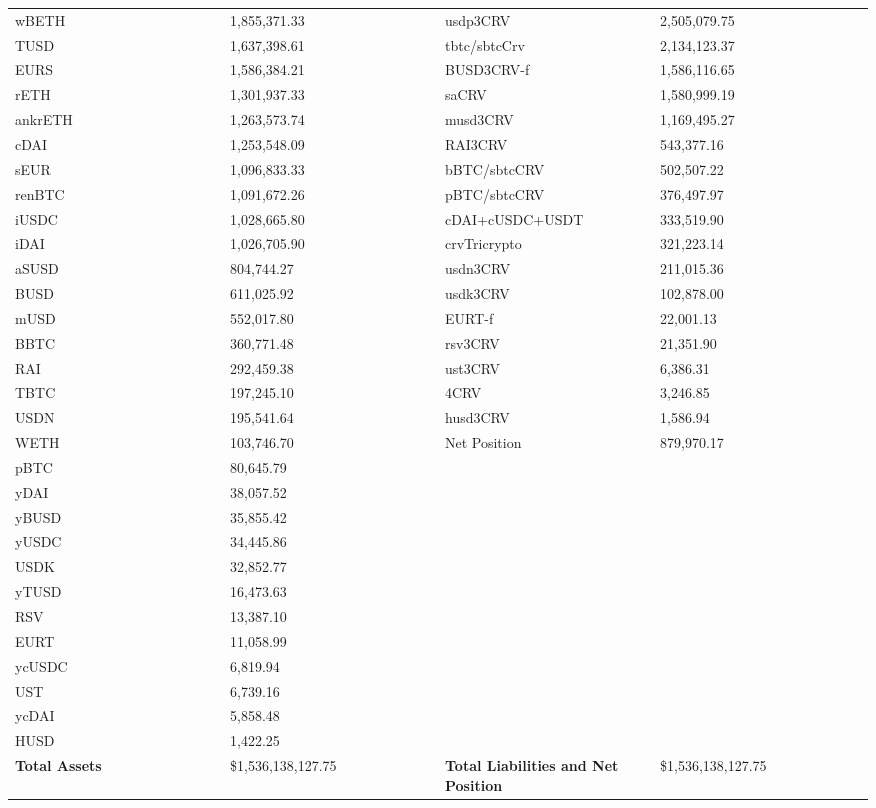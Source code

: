 \begin{longtable}{@{}p{0.25\linewidth}p{0.25\linewidth}p{0.25\linewidth}p{0.25\linewidth}@{}}
wBETH & 1,855,371.33 & usdp3CRV &2,505,079.75 \\
TUSD & 1,637,398.61 & tbtc/sbtcCrv &2,134,123.37 \\
EURS & 1,586,384.21 & BUSD3CRV-f &1,586,116.65 \\
rETH & 1,301,937.33 & saCRV &1,580,999.19 \\
ankrETH & 1,263,573.74 & musd3CRV &1,169,495.27 \\
cDAI & 1,253,548.09 & RAI3CRV &543,377.16 \\
sEUR & 1,096,833.33 & bBTC/sbtcCRV &502,507.22 \\
renBTC & 1,091,672.26 & pBTC/sbtcCRV &376,497.97 \\
iUSDC & 1,028,665.80 & cDAI+cUSDC+USDT &333,519.90 \\
iDAI & 1,026,705.90 & crvTricrypto &321,223.14 \\
aSUSD & 804,744.27 & usdn3CRV &211,015.36 \\
BUSD & 611,025.92 & usdk3CRV &102,878.00 \\
mUSD & 552,017.80 & EURT-f &22,001.13 \\
BBTC & 360,771.48 & rsv3CRV &21,351.90 \\
RAI & 292,459.38 & ust3CRV &6,386.31 \\
TBTC & 197,245.10 & 4CRV &3,246.85 \\
USDN & 195,541.64 & husd3CRV &1,586.94 \\
WETH & 103,746.70 & Net Position &879,970.17 \\
pBTC & 80,645.79 & & \\
yDAI & 38,057.52 & & \\
yBUSD & 35,855.42 & & \\
yUSDC & 34,445.86 & & \\
USDK & 32,852.77 & & \\
yTUSD & 16,473.63 & & \\
RSV & 13,387.10 & & \\
EURT & 11,058.99 & & \\
ycUSDC & 6,819.94 & & \\
UST & 6,739.16 & & \\
ycDAI & 5,858.48 & & \\
HUSD & 1,422.25 & & \\

\midrule

\textbf{Total Assets} & \$1,536,138,127.75 & \textbf{Total Liabilities and Net Position} & \$1,536,138,127.75 \\

\bottomrule

\end{longtable}
